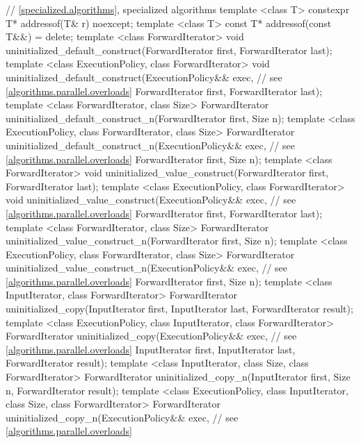\begin{codeblock}
{  // \ref{specialized.algorithms}, specialized algorithms
  template <class T> constexpr T* addressof(T& r) noexcept;
  template <class T> const T* addressof(const T&&) = delete;
  template <class ForwardIterator>
    void uninitialized_default_construct(ForwardIterator first, ForwardIterator last);
  template <class ExecutionPolicy, class ForwardIterator>
    void uninitialized_default_construct(ExecutionPolicy&& exec, // see \ref{algorithms.parallel.overloads}
                                         ForwardIterator first, ForwardIterator last);
  template <class ForwardIterator, class Size>
    ForwardIterator uninitialized_default_construct_n(ForwardIterator first, Size n);
  template <class ExecutionPolicy, class ForwardIterator, class Size>
    ForwardIterator uninitialized_default_construct_n(ExecutionPolicy&& exec, // see \ref{algorithms.parallel.overloads}
                                                      ForwardIterator first, Size n);
  template <class ForwardIterator>
    void uninitialized_value_construct(ForwardIterator first, ForwardIterator last);
  template <class ExecutionPolicy, class ForwardIterator>
    void uninitialized_value_construct(ExecutionPolicy&& exec, // see \ref{algorithms.parallel.overloads}
                                       ForwardIterator first, ForwardIterator last);
  template <class ForwardIterator, class Size>
    ForwardIterator uninitialized_value_construct_n(ForwardIterator first, Size n);
  template <class ExecutionPolicy, class ForwardIterator, class Size>
    ForwardIterator uninitialized_value_construct_n(ExecutionPolicy&& exec, // see \ref{algorithms.parallel.overloads}
                                                    ForwardIterator first, Size n);
  template <class InputIterator, class ForwardIterator>
    ForwardIterator uninitialized_copy(InputIterator first, InputIterator last,
                                       ForwardIterator result);
  template <class ExecutionPolicy, class InputIterator, class ForwardIterator>
    ForwardIterator uninitialized_copy(ExecutionPolicy&& exec, // see \ref{algorithms.parallel.overloads}
                                       InputIterator first, InputIterator last,
                                       ForwardIterator result);
  template <class InputIterator, class Size, class ForwardIterator>
    ForwardIterator uninitialized_copy_n(InputIterator first, Size n,
                                         ForwardIterator result);
  template <class ExecutionPolicy, class InputIterator, class Size, class ForwardIterator>
    ForwardIterator uninitialized_copy_n(ExecutionPolicy&& exec, // see \ref{algorithms.parallel.overloads}
}
\end{codeblock}
